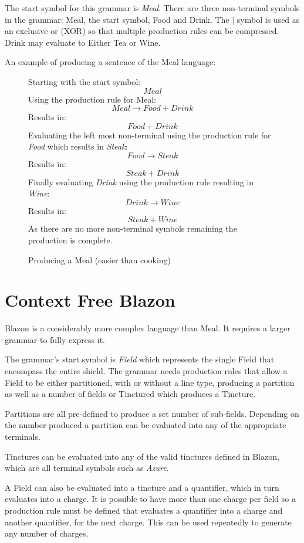 The start symbol for this grammar is \emph{Meal}. There are three non-terminal symbols in the grammar: Meal, the start symbol, Food and Drink. The $|$ symbol is used as an exclusive or (XOR) so that multiple production rules can be compressed. Drink may evaluate to Either Tea or Wine. 



An example of producing a sentence of the Meal language:

\begin{figure}[H]

Starting with the start symbol:
\[Meal\] 
Using the production rule for Meal:
\[ Meal \to Food + Drink \]
Results in:
\[Food + Drink\]
Evaluating the left most non-terminal using the production rule for \emph{Food} which results in \emph{Steak}:
\[ Food \to Steak \]
Results in:
\[Steak + Drink\]
Finally evaluating \emph{Drink} using the production rule resulting in \emph{Wine}:
\[ Drink \to  Wine\]
Results in:
\[ Steak + Wine\]
As there are no more non-terminal symbols remaining the production is complete.

\caption{Producing a Meal (easier than cooking)}
\end{figure}


\section{Context Free Blazon}

Blazon is a considerably more complex language than Meal.  It requires a larger grammar to fully express it.  

The grammar's start symbol is \emph{Field} which represents the single Field that encompass the entire shield.  The grammar needs production rules that allow a Field to be either partitioned, with or without a line type, producing a partition as well as a number of fields or Tinctured which produces a Tincture. 



Partitions are all pre-defined to produce a set number of sub-fields.  Depending on the number produced a partition can be evaluated into any of the appropriate terminals.

Tinctures can be evaluated into any of the valid tinctures defined in Blazon, which are all terminal symbols such as \emph{Azure}. 



A Field can also be evaluated into a tincture and a quantifier, which in turn evaluates into a charge.  It is possible to have more than one charge per field so a production rule must be defined that evaluates a quantifier into a charge and another quantifier, for the next charge. This can be used repeatedly to generate any number of charges. 


